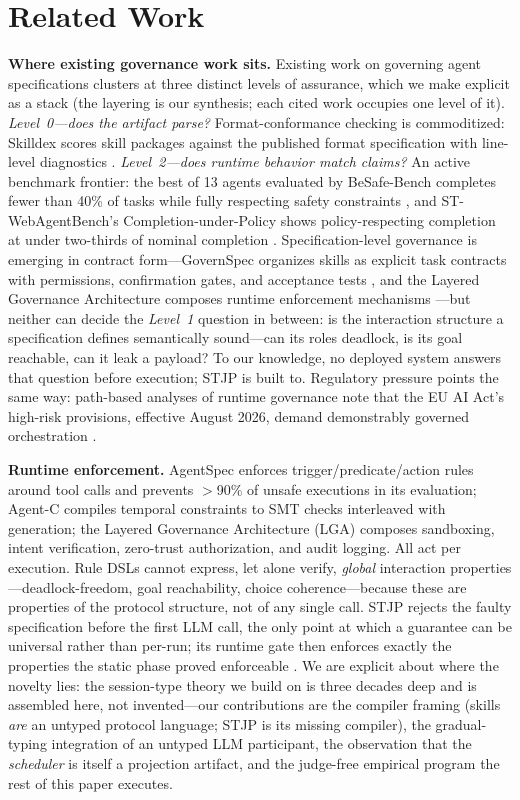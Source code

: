 \documentclass{article}
\newcommand{\stjp}{\textsc{STJP}}
\begin{document}
\section{Related Work}\label{sec:related}
\textbf{Where existing governance work sits.} Existing work on governing agent specifications clusters at three distinct levels of assurance, which we make explicit as a stack (the layering is our synthesis; each cited work occupies one level of it). \emph{Level~0---does the artifact parse?} Format-conformance checking is commoditized: Skilldex scores skill packages against the published format specification with line-level diagnostics \citep{skilldex}. \emph{Level~2---does runtime behavior match claims?} An active benchmark frontier: the best of 13 agents evaluated by BeSafe-Bench completes fewer than 40\% of tasks while fully respecting safety constraints \citep{besafe}, and ST-WebAgentBench's Completion-under-Policy shows policy-respecting completion at under two-thirds of nominal completion \citep{stweb}. Specification-level governance is emerging in contract form---GovernSpec organizes skills as explicit task contracts with permissions, confirmation gates, and acceptance tests \citep{governspec}, and the Layered Governance Architecture composes runtime enforcement mechanisms \citep{lga}---but neither can decide the \emph{Level~1} question in between: is the interaction structure a specification defines semantically sound---can its roles deadlock, is its goal reachable, can it leak a payload? To our knowledge, no deployed system answers that question before execution; \stjp{} is built to. Regulatory pressure points the same way: path-based analyses of runtime governance note that the EU AI Act's high-risk provisions, effective August 2026, demand demonstrably governed orchestration \citep{pathgov}.

\textbf{Runtime enforcement.} AgentSpec \citep{agentspec} enforces trigger/predicate/action rules around tool calls and prevents $>$90\% of unsafe executions in its evaluation; Agent-C \citep{agentc} compiles temporal constraints to SMT checks interleaved with generation; the Layered Governance Architecture (LGA) \citep{lga} composes sandboxing, intent verification, zero-trust authorization, and audit logging. All act per execution. Rule DSLs cannot express, let alone verify, \emph{global} interaction properties---deadlock-freedom, goal reachability, choice coherence---because these are properties of the protocol structure, not of any single call. \stjp{} rejects the faulty specification before the first LLM call, the only point at which a guarantee can be universal rather than per-run; its runtime gate then enforces exactly the properties the static phase proved enforceable \citep{bocchi13}. We are explicit about where the novelty lies: the session-type theory we build on is three decades deep and is assembled here, not invented---our contributions are the compiler framing (skills \emph{are} an untyped protocol language; \stjp{} is its missing compiler), the gradual-typing integration of an untyped LLM participant, the observation that the \emph{scheduler} is itself a projection artifact, and the judge-free empirical program the rest of this paper executes.
\end{document}
